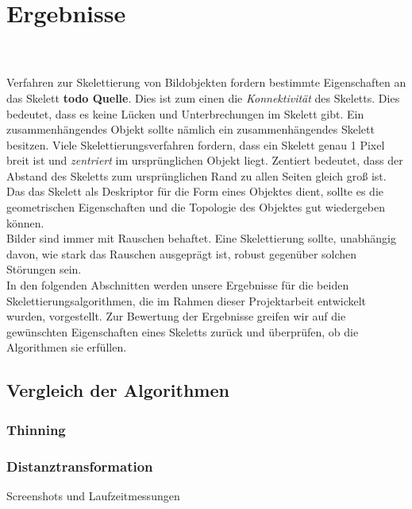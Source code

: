 \chapter{Ergebnisse}
\\\\
Verfahren zur Skelettierung von Bildobjekten fordern bestimmte Eigenschaften an das Skelett \textbf{todo Quelle}. Dies ist zum einen die \emph{Konnektivität} des Skeletts. Dies bedeutet, dass es keine Lücken und Unterbrechungen im Skelett gibt. Ein zusammenhängendes Objekt sollte nämlich ein zusammenhängendes Skelett besitzen. 
Viele Skelettierungsverfahren fordern, dass ein Skelett genau 1 Pixel breit ist und \emph{zentriert} im ursprünglichen Objekt liegt. Zentiert bedeutet, dass der Abstand des Skeletts zum ursprünglichen Rand zu allen Seiten gleich groß ist.\\
Das das Skelett als Deskriptor für die Form eines Objektes dient, sollte es die geometrischen Eigenschaften und die Topologie des Objektes gut wiedergeben können.\\
Bilder sind immer mit Rauschen behaftet. Eine Skelettierung sollte, unabhängig davon, wie stark das Rauschen ausgeprägt ist, robust gegenüber solchen Störungen sein.\\
In den folgenden Abschnitten werden unsere Ergebnisse für die beiden Skelettierungsalgorithmen, die im
Rahmen dieser Projektarbeit entwickelt wurden, vorgestellt. Zur Bewertung der Ergebnisse greifen wir auf die
gewünschten Eigenschaften eines Skeletts zurück und überprüfen, ob die Algorithmen sie erfüllen.
\section{Vergleich der Algorithmen}
\subsection{Thinning}
\subsection{Distanztransformation}
Screenshots und Laufzeitmessungen
\newpage
